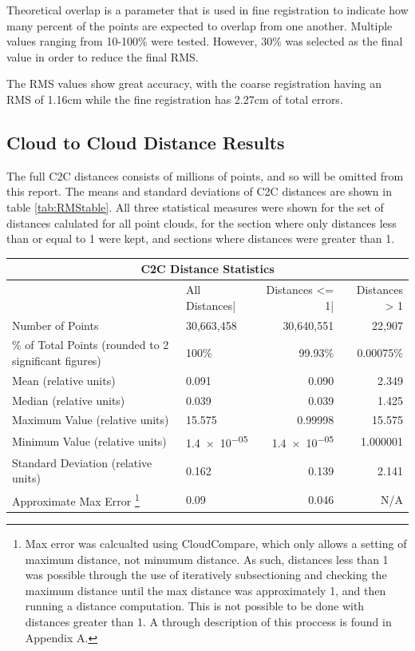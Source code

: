 \documentclass[man]{apa7}
\begin{document}
Theoretical overlap is a parameter that is used in fine registration to indicate how many percent of the points are expected to overlap from one another. Multiple values ranging from 10-100\% were tested. However, 30\% was selected as the final value in order to reduce the final RMS.

The RMS values show great accuracy, with the coarse registration having an RMS of 1.16cm while the fine registration has 2.27cm of total errors.


\subsection{Cloud to Cloud Distance Results}

The full C2C distances consists of millions of points, and so will be omitted from this report. The means and standard deviations of C2C distances are shown in table \ref{tab:RMStable}. All three statistical measures were shown for the set of distances calulated for all point clouds, for the section where only distances less than or equal to 1 were kept, and sections where distances were greater than 1.

\begin{minipage}{\linewidth}
  \small
  \setlength{\tabcolsep}{3pt} %
  \renewcommand{\arraystretch}{0.8} %
  \label{tab:RMStable}
  \begin{tabular}{@{}llrr@{}}         \toprule
  \multicolumn{4}{c}{C2C Distance Statistics }        \\ \toprule{}
  &  All Distances|    & Distances <= 1| & Distances > 1 \\ \midrule
  Number of Points & 30,663,458  & 30,640,551  & 22,907  \\
  \% of Total Points (rounded to 2 significant figures) & 100\% & 99.93\% & 0.00075\% \\
  Mean (relative units)      & 0.091 & 0.090 & 2.349  \\
  Median (relative units)    & 0.039 &  0.039  & 1.425   \\
  Maximum Value (relative units)       & 15.575  & 0.99998  & 15.575   \\
  Minimum Value (relative units)       & \num{1.4e-05}  & \num{1.4e-05} & 1.000001  \\
  Standard Deviation (relative units)  & 0.162  & 0.139 & 2.141 \\ 
  Approximate Max Error \footnote{Max error was calcualted using CloudCompare, which only allows a setting of maximum distance, not minumum distance. As such, distances less than 1 was possible through the use of iteratively subsectioning and checking the maximum distance until the max distance was approximately 1, and then running a distance computation. This is not possible to be done with distances greater than 1. A through description of this proccess is found in Appendix A.} & 0.09 &  0.046 & N/A \\ \bottomrule
  \end{tabular}
\end{minipage}
\end{document}
